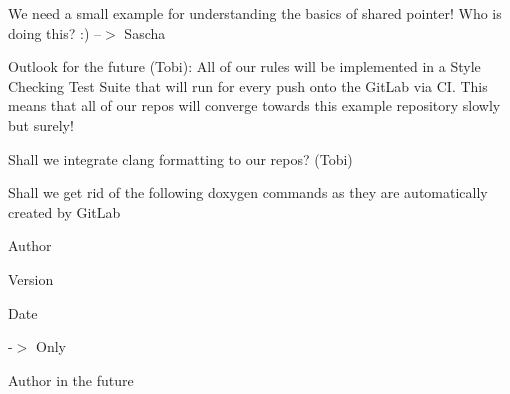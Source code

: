 \begin{DoxyEnumerate}
\item We need a small example for understanding the basics of shared pointer! Who is doing this? \+:) --$>$ Sascha
\end{DoxyEnumerate}
\begin{DoxyEnumerate}
\item Outlook for the future (Tobi)\+: All of our rules will be implemented in a Style Checking Test Suite that will run for every push onto the Git\+Lab via CI. This means that all of our repos will converge towards this example repository slowly but surely!
\end{DoxyEnumerate}
\begin{DoxyEnumerate}
\item Shall we integrate clang formatting to our repos? (Tobi)
\end{DoxyEnumerate}
\begin{DoxyEnumerate}
\item Shall we get rid of the following doxygen commands as they are automatically created by Git\+Lab
\begin{DoxyItemize}
\item \begin{DoxyAuthor}{Author}

\end{DoxyAuthor}

\item \begin{DoxyVersion}{Version}

\end{DoxyVersion}

\item \begin{DoxyDate}{Date}

\end{DoxyDate}
-\/$>$ Only \begin{DoxyAuthor}{Author}
in the future
\end{DoxyAuthor}

\end{DoxyItemize}
\end{DoxyEnumerate}
